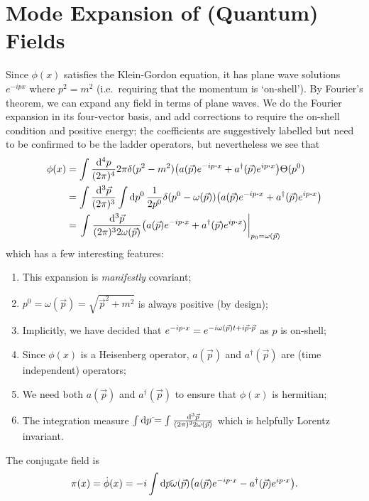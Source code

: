 \documentclass[notes.tex]{subfiles}
\begin{document}
\section{Mode Expansion of (Quantum) Fields}
Since $\phi(x)$ satisfies the Klein-Gordon equation, it has plane wave solutions $e^{-ipx}$ where $p^2 = m^2$ (i.e.~requiring that the momentum is `on-shell'). 
By Fourier's theorem, we can expand any field in terms of plane waves. 
We do the Fourier expansion in its four-vector basis, and add corrections to require the on-shell condition and positive energy; the coefficients are suggestively labelled but need to be confirmed to be the ladder operators, but nevertheless we see that
\begin{align*}
    \phi(x) &= \int \frac{\dd[4]{p}}{(2\pi)^4} 2\pi\delta(p^2 - m^2)\qty(a(\vec{p})e^{-ip\vdot x} + a^\dagger(\vec{p})e^{ip\vdot x})\Theta(p^0)\\
    &= \int \frac{\dd[3]{\vec{p}}}{(2\pi)^3} \int \dd{p^0}\frac{1}{2p^0}\delta(p^0 - \omega(\vec{p}))\qty(a(\vec{p})e^{-ip\vdot x} + a^\dagger(\vec{p})e^{ip\vdot x})\\
    &= \eval{\int \frac{\dd[3]{\vec{p}}}{(2\pi)^3 2\omega(\vec{p})} \qty(a(\vec{p})e^{-ip\vdot x} + a^\dagger(\vec{p})e^{ip\vdot x}) }_{p_0 = \omega(\vec{p})}
\end{align*}
which has a few interesting features:
\begin{enumerate}
    \item This expansion is \emph{manifestly} covariant;
    \item $p^0 = \omega(\vec{p}) = \sqrt{\vec{p}^2 + m^2}$ is always positive (by design);
    \item Implicitly, we have decided that $e^{-ip\vdot x} = e^{-i\omega(\vec{p})t + i \vec{p}\vdot\vec{p}}$ as $p$ is on-shell;
    \item Since $\phi(x)$ is a Heisenberg operator, $a(\vec{p})$ and $a^\dagger (\vec{p})$ are (time independent) operators;
    \item We need both $a(\vec{p})$ and $a^\dagger(\vec{p})$ to ensure that $\phi(x)$ is hermitian;
    \item The integration measure $\int\dds{p} = \int\frac{\dd[3]{\vec{p}}}{(2\pi)^3 2\omega(\vec{p})}$ which is helpfully Lorentz invariant.
\end{enumerate}

The conjugate field is
\begin{align*}
    \pi(x) = \dot\phi(x) = -i\int\dds{p}\omega(\vec{p})\qty(a(\vec{p})e^{-ip\vdot x} - a^\dagger(\vec{p})e^{ip\vdot x}).
\end{align*}
\end{document}
